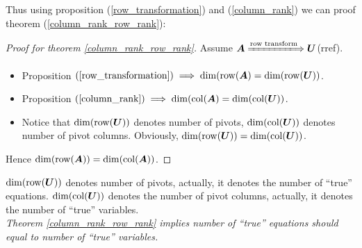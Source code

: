 Thus using proposition (\ref{row_transformation}) and (\ref{column_rank}) we can proof theorem (\ref{column_rank_row_rank}):
\begin{proof}[Proof for theorem \ref{column_rank_row_rank}]
Assume $\bm A\xLongrightarrow{\text{row transform}}\bm U$(rref).\\
\begin{itemize}
\item
Proposition $(\text{\ref{row_transformation}})\implies \dim(\operatorname{row}(\bm A) = \dim(\operatorname{row}(\bm U))$.
\item
Proposition $(\text{\ref{column_rank}})\implies \dim(\operatorname{col}(\bm A) = \dim(\operatorname{col}(\bm U))$.
\item
Notice that $\dim(\operatorname{row}(\bm U))$ denotes number of pivots, $\dim(\operatorname{col}(\bm U))$ denotes number of pivot columns. Obviously, $\dim(\operatorname{row}(\bm U))=\dim(\operatorname{col}(\bm U))$.
\end{itemize}
Hence $\dim(\operatorname{row}(\bm A))=\dim(\operatorname{col}(\bm A))$.
\end{proof}
\begin{remark}
$\dim(\operatorname{row}(\bm U))$ denotes number of pivots, actually, it denotes the number of ``true'' equations. $\dim(\operatorname{col}(\bm U))$ denotes the number of pivot columns, actually, it denotes the number of ``true'' variables.\\
\emph{Theorem \ref{column_rank_row_rank} implies number of ``true'' equations should equal to number of ``true'' variables.}
\end{remark}
